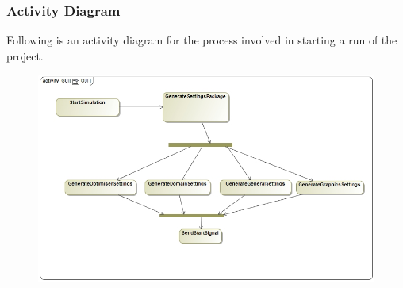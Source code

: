 \documentclass[11pt]{article}
\begin{document}
\subsubsection{Activity Diagram}
Following is an activity diagram for the process involved in starting a run of the project.
\begin{figure}[H]
	\includegraphics[scale=0.45]{GUI_Activity.jpg}
\end{figure}
\end{document}
